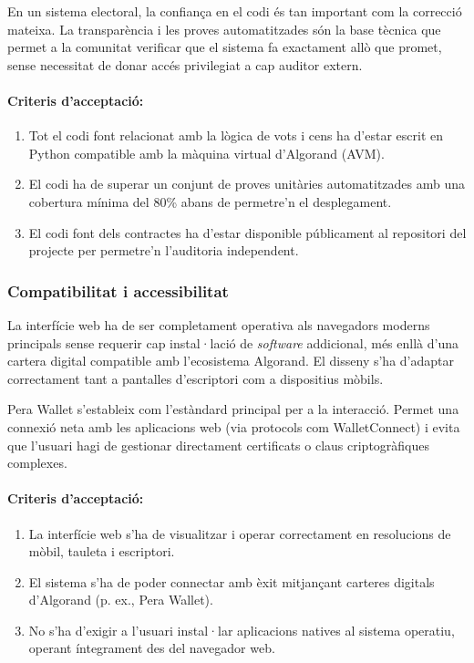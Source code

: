 En un sistema electoral, la confiança en el codi és tan important com la correcció mateixa. 
La transparència i les proves automatitzades són la base tècnica que permet a la comunitat verificar que el sistema fa exactament allò que promet, sense necessitat de donar accés privilegiat a cap auditor extern.

\paragraph{Criteris d'acceptació:}
\begin{enumerate}[label=\roman*.]
    \item Tot el codi font relacionat amb la lògica de vots i cens ha d'estar escrit en Python compatible amb la màquina virtual d'Algorand (AVM).
    \item El codi ha de superar un conjunt de proves unitàries automatitzades amb una cobertura mínima del 80\% abans de permetre'n el desplegament.
    \item El codi font dels contractes ha d'estar disponible públicament al repositori del projecte per permetre'n l'auditoria independent.
\end{enumerate}

\subsubsection{Compatibilitat i accessibilitat}

La interfície web ha de ser completament operativa als navegadors moderns principals sense requerir cap instal·lació de \textit{software} addicional, més enllà d'una cartera digital compatible amb l'ecosistema Algorand.
El disseny s'ha d'adaptar correctament tant a pantalles d'escriptori com a dispositius mòbils.

Pera Wallet s'estableix com l'estàndard principal per a la interacció. Permet una connexió neta amb les aplicacions web (via protocols com WalletConnect) i evita que l'usuari hagi de gestionar directament certificats o claus criptogràfiques complexes.

\paragraph{Criteris d'acceptació:}
\begin{enumerate}[label=\roman*.]
    \item La interfície web s'ha de visualitzar i operar correctament en resolucions de mòbil, tauleta i escriptori.
    \item El sistema s'ha de poder connectar amb èxit mitjançant carteres digitals d'Algorand (p. ex., Pera Wallet).
    \item No s'ha d'exigir a l'usuari instal·lar aplicacions natives al sistema operatiu, operant íntegrament des del navegador web.
\end{enumerate}

